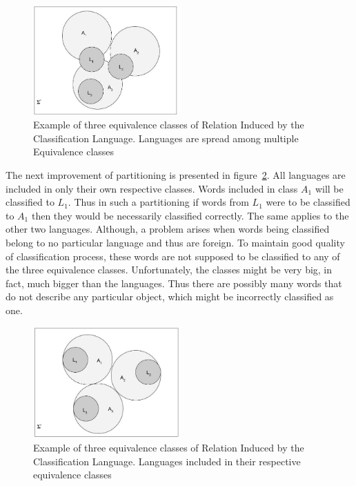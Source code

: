 \documentclass{mini}
\begin{document}
\begin{figure}[H]
    \centering
    \includegraphics[width=0.5\textwidth]{./images/equivalence_classes_high_pt.jpg}
    \caption{Example of three equivalence classes of Relation Induced by the Classification Language. Languages are spread among multiple Equivalence classes}
    \label{fig:eq_classes_high_precision}
\end{figure}

The next improvement of partitioning is presented in figure~\ref{fig:eq_classes}. All languages are included in only their own respective classes. Words included in class $A_{1}$ will be classified to $L_{1}$. Thus in such a partitioning if words from $L_{1}$ were to be classified to $A_{1}$ then they would be necessarily classified correctly. The same applies to the other two languages. Although, a problem arises when words being classified belong to no particular language and thus are foreign. To maintain good quality of classification process, these words are not supposed to be classified to any of the three equivalence classes. Unfortunately, the classes might be very big, in fact, much bigger than the languages. Thus there are possibly many words that do not describe any particular object, which might be incorrectly classified as one. 

\begin{figure}[H]
    \centering
    \includegraphics[width=0.5\textwidth]{./images/equivalence_classes.jpg}
    \caption{Example of three equivalence classes of Relation Induced by the Classification Language. Languages included in their respective equivalence classes}
    \label{fig:eq_classes}
\end{figure}
\end{document}
